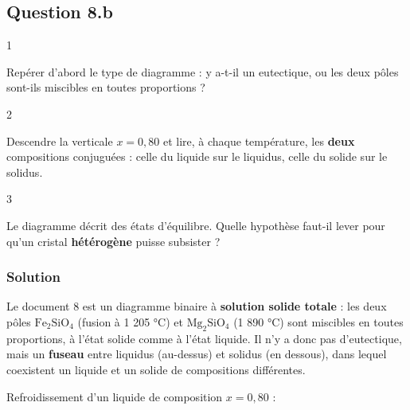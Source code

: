 \documentclass[11pt,a4paper]{article}
\begin{document}
\hypertarget{question-8.b}{%
\subsection{Question 8.b}\label{question-8.b}}

\begin{indication}{1}

Repérer d'abord le type de diagramme : y a-t-il un eutectique, ou les deux pôles sont-ils miscibles en toutes proportions ?

\end{indication}

\begin{indication}{2}

Descendre la verticale \(x = 0{,}80\) et lire, à chaque température, les \textbf{deux} compositions conjuguées : celle du liquide sur le liquidus, celle du solide sur le solidus.

\end{indication}

\begin{indication}{3}

Le diagramme décrit des états d'équilibre. Quelle hypothèse faut-il lever pour qu'un cristal \textbf{hétérogène} puisse subsister ?

\end{indication}

\hypertarget{solution-24}{%
\subsubsection{Solution}\label{solution-24}}

Le document 8 est un diagramme binaire à \textbf{solution solide totale} : les deux pôles \(\mathrm{Fe_2SiO_4}\) (fusion à 1 205 °C) et \(\mathrm{Mg_2SiO_4}\) (1 890 °C) sont miscibles en toutes proportions, à l'état solide comme à l'état liquide. Il n'y a donc pas d'eutectique, mais un \textbf{fuseau} entre liquidus (au-dessus) et solidus (en dessous), dans lequel coexistent un liquide et un solide de compositions différentes.

Refroidissement d'un liquide de composition \(x = 0{,}80\) :
\end{document}
